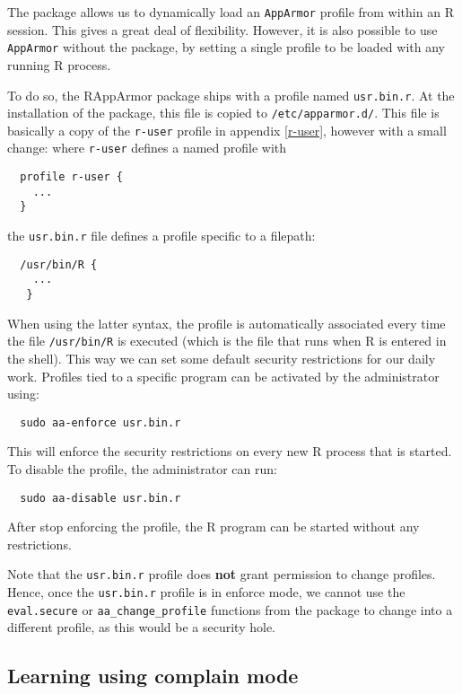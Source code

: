 \documentclass[article]{jss}
\newcommand{\R}{\textsf{R}\xspace}
\newcommand{\AppArmor}{\texttt{AppArmor}\xspace}
\newcommand{\RAppArmor}{\pkg{RAppArmor}\xspace}
\begin{document}
The \RAppArmor package allows us to dynamically load an \AppArmor profile
from within an \R session. This gives a great deal of flexibility. However, it
is also possible to use \AppArmor without the \RAppArmor package, by setting a
single profile to be loaded with any running \R process.

To do so, the RAppArmor package ships with a profile named \texttt{usr.bin.r}.
At the installation of the package, this file is copied to \texttt{/etc/apparmor.d/}.
This file is basically a copy of the \texttt{r-user} profile in appendix
\ref{r-user}, however with a small change: where \texttt{r-user} defines
a named profile with
\begin{verbatim}
  profile r-user {
    ...
  }
\end{verbatim}
the \texttt{usr.bin.r} file defines a profile specific to a filepath:
\begin{verbatim}
  /usr/bin/R {
    ...
   }
\end{verbatim}

When using the latter syntax, the profile is automatically associated every time
the file \texttt{/usr/bin/R} is executed (which is the file that runs when
\R is entered in the shell). This way we can set some default security
restrictions for our daily work. Profiles tied to a specific program can be
activated by the administrator using:
\begin{verbatim}
  sudo aa-enforce usr.bin.r
\end{verbatim}
This will enforce the security restrictions on every new \R process that is
started. To disable the profile, the administrator can run:
\begin{verbatim}
  sudo aa-disable usr.bin.r
\end{verbatim}
After stop enforcing the profile, the \R program can be started without any
restrictions.

Note that the \texttt{usr.bin.r} profile does \textbf{not} grant permission to
change profiles. Hence, once the \texttt{usr.bin.r} profile is in enforce mode,
we cannot use the \texttt{eval.secure} or \texttt{aa\_change\_profile} functions
from the \RAppArmor package to change into a different profile, as this
would be a security hole.

\subsection{Learning using complain mode}
\end{document}
